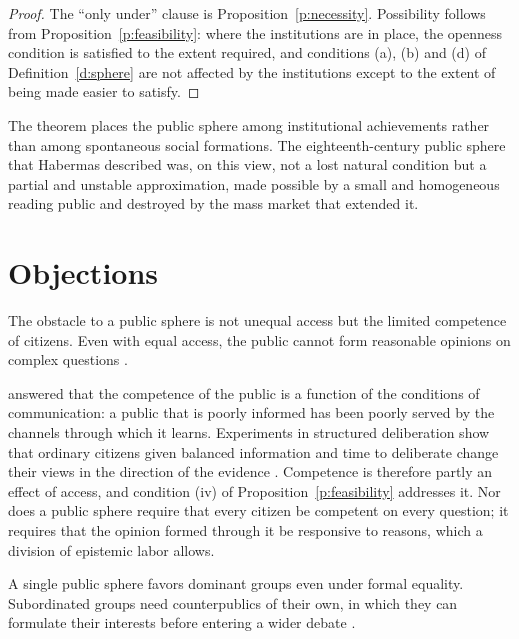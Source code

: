 \documentclass{situationist-preprint}
\begin{document}
\begin{proof}
The \enquote{only under} clause is Proposition~\ref{p:necessity}. Possibility follows from Proposition~\ref{p:feasibility}: where the institutions are in place, the openness condition is satisfied to the extent required, and conditions (a), (b) and (d) of Definition~\ref{d:sphere} are not affected by the institutions except to the extent of being made easier to satisfy.
\end{proof}

The theorem places the public sphere among institutional achievements rather than among spontaneous social formations. The eighteenth-century public sphere that Habermas described was, on this view, not a lost natural condition but a partial and unstable approximation, made possible by a small and homogeneous reading public and destroyed by the mass market that extended it.

\section{Objections}

\begin{objection}[Lippmann]
The obstacle to a public sphere is not unequal access but the limited competence of citizens. Even with equal access, the public cannot form reasonable opinions on complex questions \citep{Lippmann1922}.
\end{objection}

\begin{reply}
\citet{Dewey1927} answered that the competence of the public is a function of the conditions of communication: a public that is poorly informed has been poorly served by the channels through which it learns. Experiments in structured deliberation show that ordinary citizens given balanced information and time to deliberate change their views in the direction of the evidence \citep{Fishkin2009}. Competence is therefore partly an effect of access, and condition (iv) of Proposition~\ref{p:feasibility} addresses it. Nor does a public sphere require that every citizen be competent on every question; it requires that the opinion formed through it be responsive to reasons, which a division of epistemic labor allows.
\end{reply}

\begin{objection}[Fraser]
A single public sphere favors dominant groups even under formal equality. Subordinated groups need counterpublics of their own, in which they can formulate their interests before entering a wider debate \citep{Fraser1990}.
\end{objection}
\end{document}
